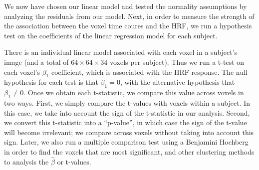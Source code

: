 
\par \indent We now have chosen our linear model and tested the normality
assumptions by analyzing the residuals from our model. Next, in order to
measure the strength of the association between the voxel time coures and the
HRF, we run a hypothesis test on the coefficients of the linear regression
model for each subject.

\par There is an individual linear model associated with each voxel in a
subject’s image (and a total of $64 \times 64 \times 34$ voxels per subject).
Thus we run a t-test on each voxel's $\beta_1$ coefficient, which is associated
with the HRF response. The null hypothesis for each test is that $ \beta_1=
0$, with the alternative hypothesis that $\beta_1 \neq 0$. Once we obtain
each t-statistic, we compare this value across voxels in two ways. First, we
simply compare the t-values with voxels within a subject. In this case, we
take into account the sign of the t-statistic in our analysis. Second, we
convert this t-statistic into a ``p-value'', in which case the sign of the
t-value will become irrelevant; we compare across voxels without taking
into account this sign. Later, we also run a multiple comparison test using a
Benjamini Hochberg in order to find the voxels that are most significant, and other clustering methods to analysis the $\hat{\beta}$ or t-values.

